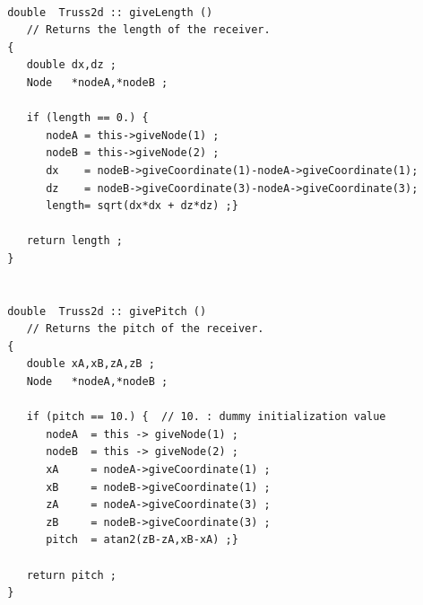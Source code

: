 \documentclass[a4paper]{article}
\begin{document}
 \begin{verbatim}

 double  Truss2d :: giveLength ()
    // Returns the length of the receiver.
 {
    double dx,dz ;
    Node   *nodeA,*nodeB ;

    if (length == 0.) {
       nodeA = this->giveNode(1) ;
       nodeB = this->giveNode(2) ;
       dx    = nodeB->giveCoordinate(1)-nodeA->giveCoordinate(1);
       dz    = nodeB->giveCoordinate(3)-nodeA->giveCoordinate(3);
       length= sqrt(dx*dx + dz*dz) ;}

    return length ;
 }


 double  Truss2d :: givePitch ()
    // Returns the pitch of the receiver.
 {
    double xA,xB,zA,zB ;
    Node   *nodeA,*nodeB ;

    if (pitch == 10.) {  // 10. : dummy initialization value
       nodeA  = this -> giveNode(1) ;
       nodeB  = this -> giveNode(2) ;
       xA     = nodeA->giveCoordinate(1) ;
       xB     = nodeB->giveCoordinate(1) ;
       zA     = nodeA->giveCoordinate(3) ;
       zB     = nodeB->giveCoordinate(3) ;
       pitch  = atan2(zB-zA,xB-xA) ;}

    return pitch ;
 }

 \end{verbatim}
\end{document}
